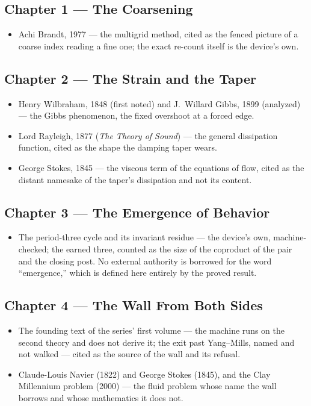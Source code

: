 \subsection*{Chapter 1 --- The Coarsening}
\begin{itemize}
\item Achi Brandt, 1977 --- the multigrid method, cited as the fenced picture of
a coarse index reading a fine one; the exact re-count itself is the device's own.
\end{itemize}

\subsection*{Chapter 2 --- The Strain and the Taper}
\begin{itemize}
\item Henry Wilbraham, 1848 (first noted) and J.\ Willard Gibbs, 1899
(analyzed) --- the Gibbs phenomenon, the fixed overshoot at a forced edge.
\item Lord Rayleigh, 1877 (\emph{The Theory of Sound}) --- the general
dissipation function, cited as the shape the damping taper wears.
\item George Stokes, 1845 --- the viscous term of the equations of flow, cited
as the distant namesake of the taper's dissipation and not its content.
\end{itemize}

\subsection*{Chapter 3 --- The Emergence of Behavior}
\begin{itemize}
\item The period-three cycle and its invariant residue --- the device's own,
machine-checked; the earned three, counted as the size of the coproduct of the
pair and the closing post. No external authority is borrowed for the word
``emergence,'' which is defined here entirely by the proved result.
\end{itemize}

\subsection*{Chapter 4 --- The Wall From Both Sides}
\begin{itemize}
\item The founding text of the series' first volume --- the machine runs on the
second theory and does not derive it; the exit past Yang--Mills, named and not
walked --- cited as the source of the wall and its refusal.
\item Claude-Louis Navier (1822) and George Stokes (1845), and the Clay
Millennium problem (2000) --- the fluid problem whose name the wall borrows and
whose mathematics it does not.
\end{itemize}

